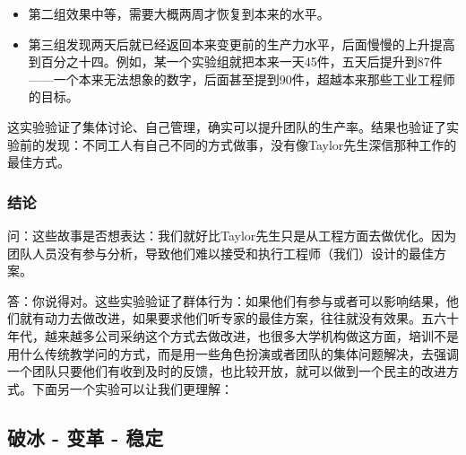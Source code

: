 \begin{itemize}
\tightlist
\item
  第二组效果中等，需要大概两周才恢复到本来的水平。
\item
  第三组发现两天后就已经返回本来变更前的生产力水平，后面慢慢的上升提高到百分之十四。例如，某一个实验组就把本来一天45件，五天后提升到87件------一个本来无法想象的数字，后面甚至提到90件，超越本来那些工业工程师的目标。\\
\end{itemize}

这实验验证了集体讨论、自己管理，确实可以提升团队的生产率。结果也验证了实验前的发现：不同工人有自己不同的方式做事，没有像Taylor先生深信那种工作的最佳方式。\\

\hypertarget{ux7ed3ux8bba}{%
\subsubsection{结论}\label{ux7ed3ux8bba}}

问：这些故事是否想表达：我们就好比Taylor先生只是从工程方面去做优化。因为团队人员没有参与分析，导致他们难以接受和执行工程师（我们）设计的最佳方案。

答：你说得对。这些实验验证了群体行为：如果他们有参与或者可以影响结果，他们就有动力去做改进，如果要求他们听专家的最佳方案，往往就没有效果。五六十年代，越来越多公司采纳这个方式去做改进，也很多大学机构做这方面，培训不是用什么传统教学问的方式，而是用一些角色扮演或者团队的集体问题解决，去强调一个团队只要他们有收到及时的反馈，也比较开放，就可以做到一个民主的改进方式。下面另一个实验可以让我们更理解：



\hypertarget{ux7834ux51b0---ux53d8ux9769---ux7a33ux5b9a}{%
\subsection{破冰 - 变革 -
稳定}\label{ux7834ux51b0---ux53d8ux9769---ux7a33ux5b9a}}


